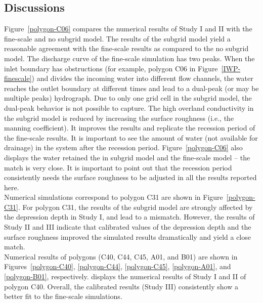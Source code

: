 \documentclass[review,11pt]{elsarticle}
\begin{document}
\subsection{Discussions}

Figure~\ref{polygon-C06} compares the numerical results of Study I and II with the fine-scale and no subgrid model. The results of the subgrid model yield a reasonable agreement with the fine-scale results as compared to the no subgrid model. The discharge curve of the fine-scale simulation has two peaks. When the inlet boundary has obstructions (for example, polygon C06 in Figure~\ref{IWP-finescale}) and divides the incoming water into different flow channels, the water reaches the outlet boundary at different times and lead to a dual-peak (or may be multiple peaks) hydrograph.  Due to only one grid cell in the subgrid model, the dual-peak behavior is not possible to capture. The high overland conductivity in the subgrid model is reduced by increasing the surface roughness (i.e., the manning coefficient). It improves the results and replicate the recession period of the fine-scale results. It is important to see the amount of water (not available for drainage) in the system after the recession period. Figure~\ref{polygon-C06} also displays the water retained the in subgrid model and the fine-scale model -- the match is very close. It is important to point out that the recession period consistently needs the surface roughness to be adjusted in all the results reported here. \\
Numerical simulations correspond to polygon C31 are shown in Figure~\ref{polygon-C31}. For polygon C31, the results of the subgrid model are strongly affected by the depression depth in Study I, and lead to a mismatch. However, the results of Study II and III indicate that calibrated values of the depression depth and the surface roughness improved the simulated results dramatically and yield a close match. \\ %
Numerical results of polygons (C40, C44, C45, A01, and B01) are shown in Figures~\ref{polygon-C40}, \ref{polygon-C44}, \ref{polygon-C45}, \ref{polygon-A01}, and \ref{polygon-B01}, respectively. displays the numerical results of Study I and II of polygon C40. Overall, the calibrated results (Study III) consistently show a better fit to the fine-scale simulations.
\end{document}

